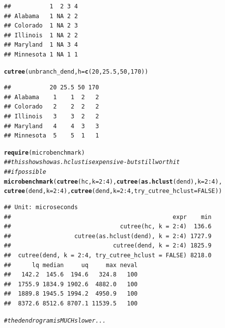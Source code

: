 \documentclass[shortnames,nojss,article]{jss}\usepackage[]{graphicx}\usepackage[]{color}
\makeatletter
\newcommand{\hlnum}[1]{\textcolor[rgb]{0.686,0.059,0.569}{#1}}%
\newcommand{\hlcom}[1]{\textcolor[rgb]{0.678,0.584,0.686}{\textit{#1}}}%
\newcommand{\hlopt}[1]{\textcolor[rgb]{0,0,0}{#1}}%
\newcommand{\hlstd}[1]{\textcolor[rgb]{0.345,0.345,0.345}{#1}}%
\newcommand{\hlkwc}[1]{\textcolor[rgb]{0.333,0.667,0.333}{#1}}%
\newcommand{\hlkwd}[1]{\textcolor[rgb]{0.737,0.353,0.396}{\textbf{#1}}}%
\newenvironment{kframe}{%
 \def\at@end@of@kframe{}%
 \ifinner\ifhmode%
  \def\at@end@of@kframe{\end{minipage}}%
  \begin{minipage}{\columnwidth}%
 \fi\fi%
 \def\FrameCommand##1{\hskip\@totalleftmargin \hskip-\fboxsep
 \colorbox{shadecolor}{##1}\hskip-\fboxsep
     \hskip-\linewidth \hskip-\@totalleftmargin \hskip\columnwidth}%
 \MakeFramed {\advance\hsize-\width
   \@totalleftmargin\z@ \linewidth\hsize
   \@setminipage}}%
 {\par\unskip\endMakeFramed%
 \at@end@of@kframe}
\newenvironment{knitrout}{}{} %
\makeatother
\begin{document}
\begin{knitrout}
\begin{kframe}
{\ttfamily\noindent\color{warningcolor}{\#\# Warning: Couldn't cut the tree - returning NA.\\\#\# Warning: You (probably) have some branches with equal heights so that there exist no height(h) that can create 2\ \ clusters}}\begin{verbatim}
##           1  2 3 4
## Alabama   1 NA 2 2
## Colorado  1 NA 2 3
## Illinois  1 NA 2 2
## Maryland  1 NA 3 4
## Minnesota 1 NA 1 1
\end{verbatim}
\begin{alltt}
\hlkwd{cutree}\hlstd{(unbranch_dend,} \hlkwc{h} \hlstd{=} \hlkwd{c}\hlstd{(}\hlnum{20}\hlstd{,} \hlnum{25.5}\hlstd{,} \hlnum{50}\hlstd{,} \hlnum{170}\hlstd{))}
\end{alltt}
\begin{verbatim}
##           20 25.5 50 170
## Alabama    1    1  2   2
## Colorado   2    2  2   2
## Illinois   3    3  2   2
## Maryland   4    4  3   3
## Minnesota  5    5  1   1
\end{verbatim}
\begin{alltt}
\hlkwd{require}\hlstd{(microbenchmark)}
\hlcom{## this shows how as.hclust is expensive - but still worth it}
\hlcom{## if possible}
\hlkwd{microbenchmark}\hlstd{(}\hlkwd{cutree}\hlstd{(hc,} \hlkwc{k} \hlstd{=} \hlnum{2}\hlopt{:}\hlnum{4}\hlstd{),} \hlkwd{cutree}\hlstd{(}\hlkwd{as.hclust}\hlstd{(dend),} \hlkwc{k} \hlstd{=} \hlnum{2}\hlopt{:}\hlnum{4}\hlstd{),}
    \hlkwd{cutree}\hlstd{(dend,} \hlkwc{k} \hlstd{=} \hlnum{2}\hlopt{:}\hlnum{4}\hlstd{),} \hlkwd{cutree}\hlstd{(dend,} \hlkwc{k} \hlstd{=} \hlnum{2}\hlopt{:}\hlnum{4}\hlstd{,} \hlkwc{try_cutree_hclust} \hlstd{=} \hlnum{FALSE}\hlstd{))}
\end{alltt}
\begin{verbatim}
## Unit: microseconds
##                                              expr    min
##                               cutree(hc, k = 2:4)  136.6
##                  cutree(as.hclust(dend), k = 2:4) 1727.9
##                             cutree(dend, k = 2:4) 1825.9
##  cutree(dend, k = 2:4, try_cutree_hclust = FALSE) 8218.0
##      lq median     uq     max neval
##   142.2  145.6  194.6   324.8   100
##  1755.9 1834.9 1902.6  4882.0   100
##  1889.8 1945.5 1994.2  4950.9   100
##  8372.6 8512.6 8707.1 11539.5   100
\end{verbatim}
\begin{alltt}
\hlcom{# the dendrogram is MUCH slower...}



\end{alltt}
\end{kframe}
\end{knitrout}
\end{document}
